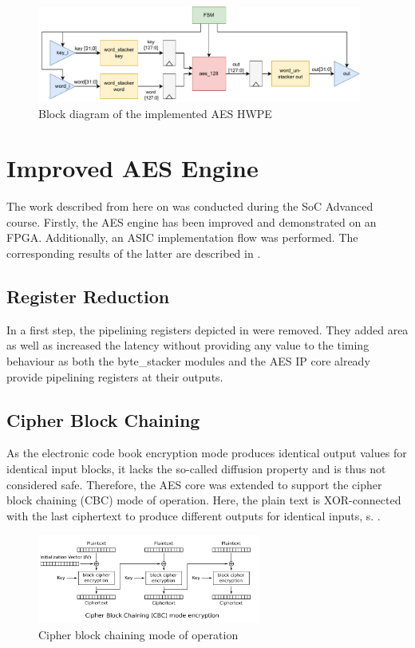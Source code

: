 \documentclass[a4paper, 12pt]{article}
\begin{document}
\begin{figure} [h]
	\centering
	\includegraphics[width=0.95\textwidth]{hwpe_aes.pdf}
	\caption{Block diagram of the implemented AES HWPE}
	\label{hwpe-aes}
\end{figure}

\section{Improved AES Engine} \label{sec:improvements}

The work described from here on was conducted during the SoC Advanced course. Firstly, the AES engine has been improved and demonstrated on an FPGA. Additionally, an ASIC implementation flow was performed. The corresponding results of the latter are described in .

\subsection{Register Reduction}

In a first step, the pipelining registers depicted in  were removed. They added area as well as increased the latency without providing any value to the timing behaviour as both the byte\_stacker modules and the AES IP core already provide pipelining registers at their outputs.

\subsection{Cipher Block Chaining}

As the electronic code book encryption mode produces identical output values for identical input blocks, it lacks the so-called diffusion property and is thus not considered safe. Therefore, the AES core was extended to support the cipher block chaining (CBC) mode of operation. Here, the plain text is XOR-connected with the last ciphertext to produce different outputs for identical inputs, s. .

\begin{figure} [h]
	\centering
	\includegraphics[width=0.65\textwidth]{cbc.png}
	\caption{Cipher block chaining mode of operation \cite{wiki_cbc}}
	\label{fig:cbc}
\end{figure}
\end{document}
